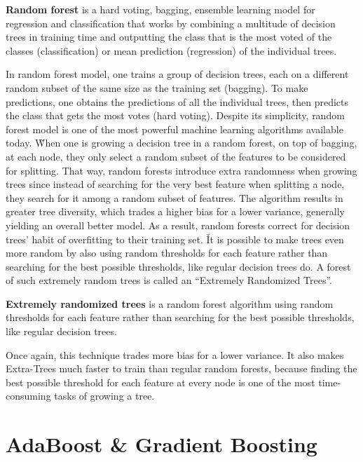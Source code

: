 \textbf{Random forest} is a hard voting, bagging, ensemble learning model for regression and classification that works
by combining a multitude of decision trees in training time and outputting the class that is the most voted of the
classes (classification) or mean prediction (regression) of the individual trees.
\ed

In random forest model, one trains a group of decision trees, each on a different random subset of the same size as
the training set (bagging). To make predictions, one obtains the predictions of all the individual trees, then
predicts the class that gets the most votes (hard voting). Despite its simplicity, random forest model is one of the
most powerful machine learning algorithms available today. \v

When one is growing a decision tree in a random forest, on top of bagging, at each node, they only select a random
subset of the features to be considered for splitting. That way, random forests introduce extra randomness when
growing trees since instead of searching for the very best feature when splitting a node, they search for it among a
random subset of features. The algorithm results in greater tree diversity, which trades a higher bias for a lower
variance, generally yielding an overall better model. As a result, random forests correct for decision trees' habit
of overfitting to their training set. \v

It is possible to make trees even more random by also using random thresholds for each feature rather than searching
for the best possible thresholds, like regular decision trees do. A forest of such extremely random trees is called
an ``Extremely Randomized Trees''.

\textbf{Extremely randomized trees} is a random forest algorithm using random thresholds for each feature rather than
searching for the best possible thresholds, like regular decision trees.
\ed

Once again, this technique trades more bias for a lower variance. It also makes Extra-Trees much faster to train
than regular random forests, because finding the best possible threshold for each feature at every node is one of
the most time-consuming tasks of growing a tree.

\section{AdaBoost \& Gradient Boosting}